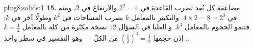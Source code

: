 \begin{solution}{pb:g8:solids:1}
\textbf{15.} مضاعفة كل بُعد تضرب  القاعدة في
$2^2 = 4$ والارتفاع في $2$، ومنه  في
$4 \times 2 = 8 = 2^3$. والتكبير بالمعامل $k$ يضرب المساحات في $k^2$
وطولًا آخر في $k$: فتنمو الحجوم بالمعامل $k^3$. و
 العليا في السؤال 12 نسخة مكبّرة من  كله
بالمعامل $k = \frac12$، إذن حجمها
$\left(\frac12\right)^3 = \frac18$ من الكلّ --- وهو التفسير
في سطر واحد.
\end{solution}

